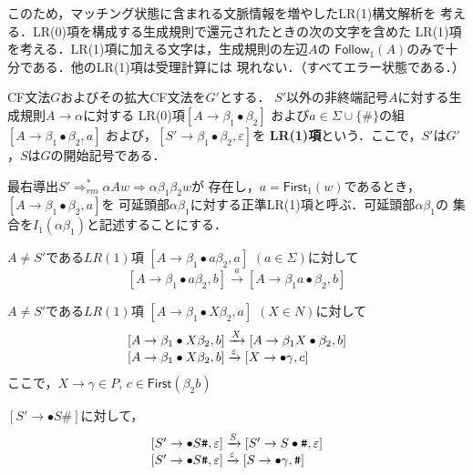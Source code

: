 \documentclass[a4j,dvipdfmx]{jbook}
\begin{document}
このため，マッチング状態に含まれる文脈情報を増やしたLR(1)構文解析を
考える．LR(0)項を構成する生成規則で還元されたときの次の文字を含めた
LR(1)項を考える．LR(1)項に加える文字は，生成規則の左辺$A$の
$\mathsf{Follow}_1(A)$のみで十分である．他のLR(1)項は受理計算には
現れない．（すべてエラー状態である．）

\begin{Def}
  CF文法$G$およびその拡大CF文法を$G'$とする．
  $S'$以外の非終端記号$A$に対する生成規則$A\rightarrow\alpha$に対する
  LR(0)項$[A\rightarrow\beta_1\bullet\beta_2]$
および$a\in\Sigma\cup\{\texttt{\#}\}$の組$[A\rightarrow\beta_1\bullet\beta_2,a]$
および，$[S'\rightarrow\beta_1\bullet\beta_2,\varepsilon]$を
{\bf LR(1)項}という．ここで，$S'$は$G'$，$S$は$G$の開始記号である．
\end{Def}

\begin{Def}
  最右導出$S'\Rightarrow^\ast_{rm}\alpha A w\Rightarrow \alpha\beta_1\beta_2 w$が
  存在し，$a=\mathsf{First}_1(w)$であるとき，$[A\rightarrow\beta_1\bullet\beta_2,a]$を
  可延頭部$\alpha\beta_1$に対する正準LR(1)項と呼ぶ．可延頭部$\alpha\beta_1$の
  集合を$I_1(\alpha\beta_1)$と記述することにする．
\end{Def}

\begin{Def}
  \begin{list}{}{}
    \item[(1)] $A\not=S'$である$LR(1)$項 $[A\rightarrow\beta_1\bullet a\beta_2,a]$ $(a\in\Sigma)$に対して
    \[[A\rightarrow\beta_1\bullet a\beta_2,b]\xrightarrow{a}[A\rightarrow\beta_1 a\bullet\beta_2,b]\]
    \item[(2)] $A\not=S'$である$LR(1)$項 $[A\rightarrow\beta_1\bullet X\beta_2,a]$ $(X\in N)$に対して
    \[\begin{array}{l}
      [A\rightarrow\beta_1\bullet X\beta_2,b]\xrightarrow{X}[A\rightarrow\beta_1 X\bullet\beta_2,b]\\\relax
      [A\rightarrow\beta_1\bullet X\beta_2,b]\xrightarrow{\varepsilon}[X\rightarrow\bullet\gamma,c]
    \end{array}\]
    ここで，$X\rightarrow\gamma\in P$, $c\in\mathsf{First}(\beta_2 b)$
    \item[(3)] $[S'\rightarrow\bullet S\texttt{\#}]$に対して，
    \[\begin{array}{l}
      [S'\rightarrow\bullet S\texttt{\#},\varepsilon]\xrightarrow{S}[S'\rightarrow S\bullet\texttt{\#},\varepsilon]\\\relax
      [S'\rightarrow\bullet S\texttt{\#},\varepsilon]\xrightarrow{\varepsilon}
      [S\rightarrow\bullet\gamma,\texttt{\#}]
    \end{array}\]
  \end{list}
\end{Def}
\end{document}
